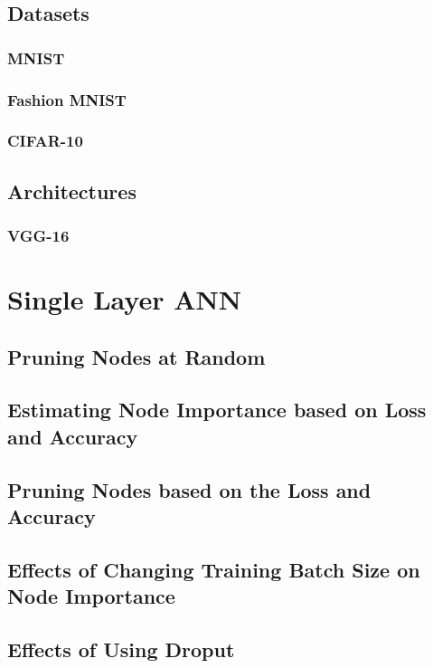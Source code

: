 \documentclass[UKenglish]{ifimaster}
\begin{document}
    
    \section{Datasets}
        \subsection{MNIST}


        \subsection{Fashion MNIST}


        \subsection{CIFAR-10}


    \section{Architectures}
        \subsection{VGG-16}

\chapter{Single Layer ANN}
    \section{Pruning Nodes at Random}


    \section{Estimating Node Importance based on Loss and Accuracy}
    
    
    \section{Pruning Nodes based on the Loss and Accuracy}


    \section{Effects of Changing Training Batch Size on Node Importance}


    \section{Effects of Using Droput}
\end{document}
